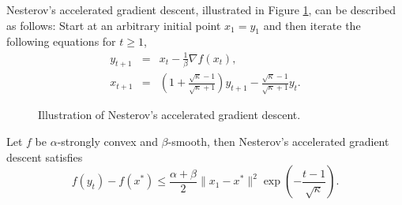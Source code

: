 Nesterov's accelerated gradient descent, illustrated in Figure \ref{fig:nesterovacc}, can be described as follows: Start at an arbitrary initial point 
$x_1 = y_1$ and then iterate the following equations for $t \geq 1$,
\begin{eqnarray*}
y_{t+1} & = & x_t  - \frac{1}{\beta} \nabla f(x_t) , \\
x_{t+1} & = & \left(1 + \frac{\sqrt{\kappa}-1}{\sqrt{\kappa}+1} \right) y_{t+1} - \frac{\sqrt{\kappa}-1}{\sqrt{\kappa}+1} y_t .
\end{eqnarray*}

\begin{figure}
\begin{center}
\end{center}
\caption{Illustration of Nesterov's accelerated gradient descent.}
\label{fig:nesterovacc}
\end{figure}

\begin{theorem}
Let $f$ be $\alpha$-strongly convex and $\beta$-smooth, then Nesterov's accelerated gradient descent satisfies
$$f(y_t) - f(x^*) \leq \frac{\alpha + \beta}{2} \|x_1 - x^*\|^2 \exp\left(- \frac{t-1}{\sqrt{\kappa}} \right).$$
\end{theorem}

